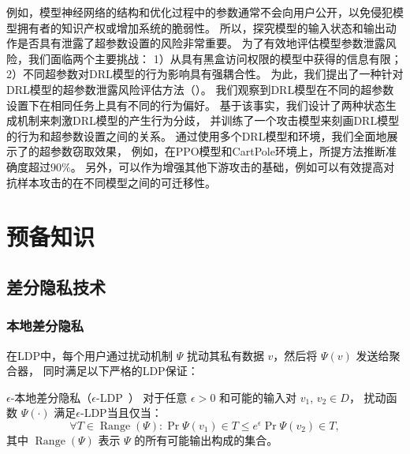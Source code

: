 \begin{itemize}
    例如，模型神经网络的结构和优化过程中的参数通常不会向用户公开，以免侵犯模型拥有者的知识产权或增加系统的脆弱性。
    所以，探究模型的输入状态和输出动作是否具有泄露了超参数设置的风险非常重要。
    为了有效地评估模型参数泄露风险，我们面临两个主要挑战：
    1）从具有黑盒访问权限的模型中获得的信息有限；
    2）不同超参数对DRL模型的行为影响具有强耦合性。
    为此，我们提出了一种针对DRL模型的超参数泄露风险评估方法（\sysname）。
    我们观察到DRL模型在不同的超参数设置下在相同任务上具有不同的行为偏好。
    基于该事实，我们设计了两种状态生成机制来刺激DRL模型的产生行为分歧，
    并训练了一个攻击模型来刻画DRL模型的行为和超参数设置之间的关系。
    通过使用多个DRL模型和环境，我们全面地展示了\sysname 的超参数窃取效果，
    例如，在PPO模型和CartPole环境上，所提方法推断准确度超过$90\%$。
    另外，\sysname 可以作为增强其他下游攻击的基础，例如\sysname 可以有效提高对抗样本攻击的在不同模型之间的可迁移性。
\end{itemize}

\chapter{预备知识}
\section{差分隐私技术}
\subsection{本地差分隐私}
在LDP中，每个用户通过扰动机制 $\Psi$ 扰动其私有数据 $v$，然后将 $\Psi(v)$ 发送给聚合器，
同时满足以下严格的LDP保证：

\begin{definition}{$\epsilon$-本地差分隐私（$\epsilon$-LDP~\cite{kasiviswanathan2011can}）} 
    对于任意 $\epsilon > 0$ 和可能的输入对 $v_1$, $v_2 \in D$，
    扰动函数 $\Psi(\cdot)$ 满足$\epsilon$-LDP当且仅当：
    \begin{equation}
        \forall T \in \operatorname{Range}(\Psi): \Pr{\Psi\left(v_{1}\right) \in T} \leq e^{\epsilon} \Pr {\Psi\left(v_{2}\right) \in T},  \nonumber
    \end{equation}
    其中 $\operatorname{Range}(\Psi)$ 表示 $\Psi$ 的所有可能输出构成的集合。
\end{definition}

